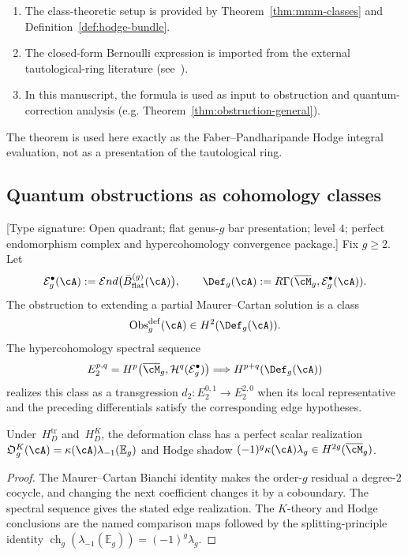 \begin{remark}
\begin{enumerate}[label=(D\arabic*)]
\item The class-theoretic setup is provided by
Theorem~\ref{thm:mmm-classes} and Definition~\ref{def:hodge-bundle}.
\item The closed-form Bernoulli expression is imported from the external
tautological-ring literature (see~\cite{FP03}).
\item In this manuscript, the formula is used as input to obstruction and
quantum-correction analysis (e.g. Theorem~\ref{thm:obstruction-general}).
\end{enumerate}
The theorem is used here exactly as the Faber--Pandharipande Hodge
integral evaluation, not as a presentation of the tautological ring.
\end{remark}

\subsection{Quantum obstructions as cohomology classes}

\begin{theorem}
\label{thm:obstruction-quantum}
\textup{[Type signature: Open quadrant; flat genus-$g$ bar
presentation; level $4$; perfect endomorphism complex and
hypercohomology convergence package.]}
Fix $g\geq2$.  Let
\[
 \mathcal E_g^\bullet(\cA)
 :=\mathcal E nd\bigl(\bar B^{(g)}_{\mathrm{flat}}(\cA)\bigr),
 \qquad
 \Def_g(\cA):=R\Gamma(\overline{\cM}_g,\mathcal E_g^\bullet(\cA)).
\]
The obstruction to extending a partial Maurer--Cartan solution is a
class
\[
 \operatorname{Obs}^{\mathrm{def}}_g(\cA)
 \in H^2(\Def_g(\cA)).
\]
The hypercohomology spectral sequence
\[
 E_2^{p,q}
 =H^p\bigl(\overline{\cM}_g,\mathcal H^q(\mathcal E_g^\bullet)\bigr)
 \Longrightarrow H^{p+q}(\Def_g(\cA))
\]
realizes this class as a transgression
$d_2\colon E_2^{0,1}\to E_2^{2,0}$ when its local representative and
the preceding differentials satisfy the corresponding edge
hypotheses.

Under~$H_D^{\mathrm{tr}}$ and~$H_D^K$, the deformation class has a
perfect scalar realization
$\mathfrak O_g^K(\cA)=\kappa(\cA)\lambda_{-1}(\mathbb E_g)$ and
Hodge shadow
$(-1)^g\kappa(\cA)\lambda_g\in H^{2g}(\overline{\cM}_g)$.
\end{theorem}

\begin{proof}
The Maurer--Cartan Bianchi identity makes the order-$g$ residual a
degree-$2$ cocycle, and changing the next coefficient changes it by a
coboundary.  The spectral sequence gives the stated edge
realization.  The $K$-theory and Hodge conclusions are the named
comparison maps followed by the splitting-principle identity
$\operatorname{ch}_g(\lambda_{-1}(\mathbb E_g))
=(-1)^g\lambda_g$.
\end{proof}

